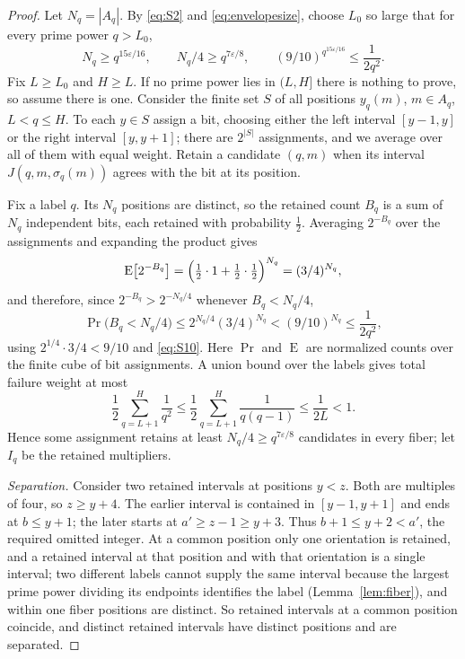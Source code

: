 \documentclass[11pt,letterpaper]{article}
\numberwithin{equation}{section}
\theoremstyle{plain}
\theoremstyle{remark}
\newcommand{\E}{\operatorname{E}}
\begin{document}
\begin{proof}
Let $N_q=|A_q|$. By \eqref{eq:S2} and \eqref{eq:envelopesize}, choose $L_0$ so large that for every prime power $q>L_0$,
\begin{equation}\label{eq:S10}
N_q\ge q^{15\varepsilon/16},\qquad N_q/4\ge q^{7\varepsilon/8},\qquad
(9/10)^{q^{15\varepsilon/16}}\le\frac1{2q^2}.
\end{equation}
Fix $L\ge L_0$ and $H\ge L$. If no prime power lies in $(L,H]$ there is nothing to prove, so assume there is one. Consider the finite set $S$ of all positions $y_q(m)$, $m\in A_q$, $L<q\le H$. To each $y\in S$ assign a bit, choosing either the left interval $[y-1,y]$ or the right interval $[y,y+1]$; there are $2^{|S|}$ assignments, and we average over all of them with equal weight. Retain a candidate $(q,m)$ when its interval $J(q,m,\sigma_q(m))$ agrees with the bit at its position.

Fix a label $q$. Its $N_q$ positions are distinct, so the retained count $B_q$ is a sum of $N_q$ independent bits, each retained with probability $\tfrac12$. Averaging $2^{-B_q}$ over the assignments and expanding the product gives
\[
\E\bigl[2^{-B_q}\bigr]=\Bigl(\tfrac12\cdot1+\tfrac12\cdot\tfrac12\Bigr)^{N_q}=(3/4)^{N_q},
\]
and therefore, since $2^{-B_q}>2^{-N_q/4}$ whenever $B_q<N_q/4$,
\begin{equation}\label{eq:S12}
\Pr\bigl(B_q<N_q/4\bigr)\le2^{N_q/4}(3/4)^{N_q}<(9/10)^{N_q}\le\frac1{2q^2},
\end{equation}
using $2^{1/4}\cdot3/4<9/10$ and \eqref{eq:S10}. Here $\Pr$ and $\E$ are normalized counts over the finite cube of bit assignments. A union bound over the labels gives total failure weight at most
\begin{equation}\label{eq:S13}
\frac12\sum_{q=L+1}^H\frac1{q^2}\le\frac12\sum_{q=L+1}^H\frac1{q(q-1)}\le\frac1{2L}<1 .
\end{equation}
Hence some assignment retains at least $N_q/4\ge q^{7\varepsilon/8}$ candidates in every fiber; let $I_q$ be the retained multipliers.

\emph{Separation.} Consider two retained intervals at positions $y<z$. Both are multiples of four, so $z\ge y+4$. The earlier interval is contained in $[y-1,y+1]$ and ends at $b\le y+1$; the later starts at $a'\ge z-1\ge y+3$. Thus $b+1\le y+2<a'$, the required omitted integer. At a common position only one orientation is retained, and a retained interval at that position and with that orientation is a single interval; two different labels cannot supply the same interval because the largest prime power dividing its endpoints identifies the label (Lemma~\ref{lem:fiber}), and within one fiber positions are distinct. So retained intervals at a common position coincide, and distinct retained intervals have distinct positions and are separated.
\end{proof}
\end{document}
